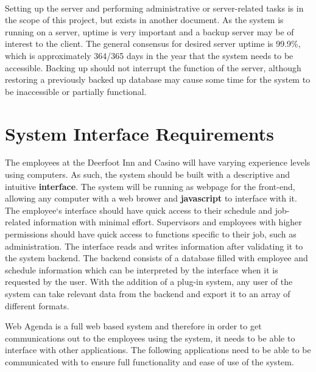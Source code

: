 \documentclass[letterpaper,12pt]{report}
\begin{document}
\paragraph*{}\hspace{0.6cm}
Setting up the server and performing administrative or server-related tasks is in the scope of this project, but exists in another document. As the system is running on a server, uptime is very important and a backup server may be of interest to the client. The general consensus for desired server uptime is 99.9\%, which is approximately 364/365 days in the year that the system needs to be accessible. Backing up should not interrupt the function of the server, although restoring a previously backed up database may cause some time for the system to be inaccessible or partially functional.

\newpage
\section{System Interface Requirements}
\hspace{1cm}The employees at the Deerfoot Inn and Casino will have varying experience levels using computers. As such, the system should be built with a descriptive and intuitive \textbf{interface}. The system will be running as webpage for the front-end, allowing any computer with a web brower and \textbf{javascript} to interface with it. The employee`s interface should have quick access to their schedule and job-related information with minimal effort. Supervisors and employees with higher permissions should have quick access to functions specific to their job, such as administration. The interface reads and writes information after validating it to the system backend. The backend consists of a database filled with employee and schedule information which can be interpreted by the interface when it is requested by the user. With the addition of a plug-in system, any user of the system can take relevant data from the backend and export it to an array of different formats.

Web Agenda is a full web based system and therefore in order to get communications out to the employees using the system, it needs to be able to interface with other applications. The following applications need to be able to be communicated with to ensure full functionality and ease of use of the system.
\end{document}

